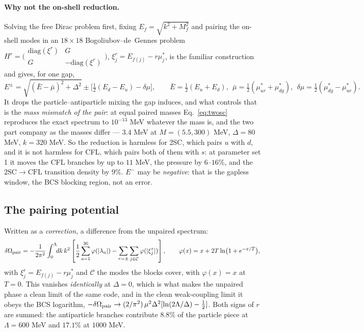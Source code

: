 \documentclass[aps,prc,onecolumn,superscriptaddress,nofootinbib,10pt]{revtex4-2}
\newcommand{\Lam}{\Lambda}
\begin{document}
\paragraph{Why not the on-shell reduction.} Solving the free Dirac problem
first, fixing $E_f = \sqrt{k^2+M_f^2}$ and pairing the on-shell modes in an
$18\times18$ Bogoliubov--de~Gennes problem
$H^r = \big(\begin{smallmatrix} \mathrm{diag}(\xi^r) & G \\
G & -\mathrm{diag}(\xi^r)\end{smallmatrix}\big)$, $\xi^r_j = E_{f(j)} -
r\mu^{*}_j$, is the familiar construction and gives, for one gap,
\begin{equation}
  E^{\pm} = \sqrt{(\bar E - \bar\mu)^2 + \Delta^2} \pm
            \Big[\tfrac12 (E_d - E_u) - \delta\mu\Big] ,
  \qquad \bar E = \tfrac12 (E_u + E_d),\ \
  \bar\mu = \tfrac12(\mu^{*}_{ur}+\mu^{*}_{dg}),\ \
  \delta\mu = \tfrac12(\mu^{*}_{dg}-\mu^{*}_{ur}) .
  \label{eq:twosc}
\end{equation}
It drops the particle--antiparticle mixing the gap induces, and what controls
that is the \emph{mass mismatch of the pair}: at equal paired masses
Eq.~\eqref{eq:twosc} reproduces the exact spectrum to $10^{-13}$ MeV whatever
the mass is, and the two part company as the masses differ --- $3.4$ MeV at
$M = (5.5, 300)$ MeV, $\Delta = 80$ MeV, $k = 320$ MeV. So the reduction is
harmless for 2SC, which pairs $u$ with $d$, and it is not harmless for CFL,
which pairs both of them with $s$: at parameter set 1 it moves the CFL
branches by up to $11$ MeV, the pressure by $6$--$16\%$, and the
$2\text{SC}\to\text{CFL}$ transition density by $9\%$. $E^{-}$ may be
\emph{negative}: that is the gapless window, the BCS blocking region, not an
error.

\subsection{The pairing potential}
\label{sec:dOmega}

Written as a \emph{correction}, a difference from the unpaired spectrum:
\begin{equation}
  \delta\Omega_{\rm pair} = -\frac{1}{2\pi^2}
    \int_0^{\Lam}\!\! dk\, k^2 \left[
    \frac12 \sum_{a=1}^{36} \varphi(|\lambda_a|)
    - \sum_{r=\pm}\sum_{j \in \mathcal C} \varphi(|\xi^r_j|) \right] ,
  \qquad
  \varphi(x) = x + 2T \ln\!\big(1+e^{-x/T}\big) ,
  \label{eq:dOmega}
\end{equation}
with $\xi^r_j = E_{f(j)} - r\mu^{*}_j$ and $\mathcal C$ the modes the blocks
cover,
with $\varphi(x) = x$ at $T = 0$. This vanishes \emph{identically} at
$\Delta = 0$, which is what makes the unpaired phase a clean limit of the same
code, and in the clean weak-coupling limit it obeys the BCS logarithm,
$-\delta\Omega_{\rm pair} \to (2/\pi^2)\,\mu^2\Delta^2[\ln(2\Lam/\Delta)-\tfrac12]$.
Both signs of $r$ are summed: the antiparticle branches contribute $8.8\%$ of
the particle piece at $\Lam = 600$ MeV and $17.1\%$ at $1000$ MeV.
\end{document}
